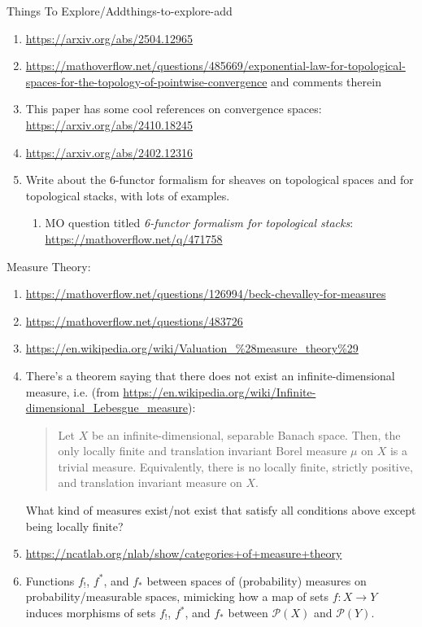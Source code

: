\begin{remark}{Things To Explore/Add}{things-to-explore-add}
\begin{enumerate}
        \item \url{https://arxiv.org/abs/2504.12965}
        \item \url{https://mathoverflow.net/questions/485669/exponential-law-for-topological-spaces-for-the-topology-of-pointwise-convergence} and comments therein
        \item This paper has some cool references on convergence spaces: \url{https://arxiv.org/abs/2410.18245}
        \item \url{https://arxiv.org/abs/2402.12316}
        \item Write about the 6-functor formalism for sheaves on topological spaces and for topological stacks, with lots of examples.
            \begin{enumerate}
                \item MO question titled \emph{6-functor formalism for topological stacks}: \url{https://mathoverflow.net/q/471758}
            \end{enumerate}
    \end{enumerate}
    Measure Theory:
    \begin{enumerate}
        \item \url{https://mathoverflow.net/questions/126994/beck-chevalley-for-measures}
        \item \url{https://mathoverflow.net/questions/483726}
        \item \url{https://en.wikipedia.org/wiki/Valuation_\%28measure_theory\%29}
        \item There's a theorem saying that there does not exist an infinite-dimensional  measure, i.e. (from \url{https://en.wikipedia.org/wiki/Infinite-dimensional_Lebesgue_measure}):
            \begin{quote}
                Let $X$ be an infinite-dimensional, separable Banach space. Then, the only locally finite and translation invariant Borel measure $\mu$ on $X$ is a trivial measure. Equivalently, there is no locally finite, strictly positive, and translation invariant measure on $X$.
            \end{quote}
            What kind of measures exist/not exist that satisfy all conditions above except being locally finite?
        \item \url{https://ncatlab.org/nlab/show/categories+of+measure+theory}
        \item Functions $f_{!}$, $f^{*}$, and $f_{*}$ between spaces of (probability) measures on probability/measurable spaces, mimicking how a map of sets $f\colon X\to Y$ induces morphisms of sets $f_{!}$, $f^{*}$, and $f_{*}$ between $\mathcal{P}(X)$ and $\mathcal{P}(Y)$.

\end{enumerate}
\end{remark}
